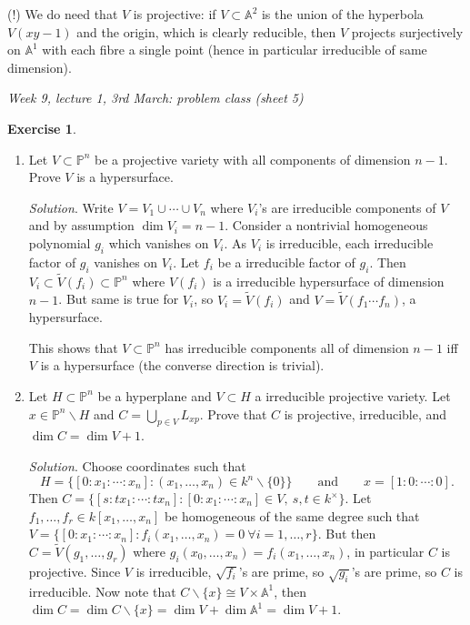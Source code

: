 \documentclass{article}
\newcommand{\A}{\mathbb{A}}
\newcommand{\p}{\mathbb{P}}
\theoremstyle{definition}
\newtheorem{exe}[defn]{Exercise}
\begin{document}
(!) We do need that $V$ is projective: if $V\subset\A^2$ is the union of the hyperbola $V(xy-1)$ and the origin, which is clearly reducible, then $V$ projects surjectively on $\A^1$ with each fibre a single point (hence in particular irreducible of same dimension).

\begin{flushright}
\textit{Week 9, lecture 1, 3rd March: problem class (sheet 5)}
\end{flushright}

\begin{exe}
\begin{enumerate}
\item Let $V\subset\p^n$ be a projective variety with all components of dimension $n-1$. Prove $V$ is a hypersurface.

\textit{Solution}. Write $V=V_1\cup\cdots\cup V_n$ where $V_i$'s are irreducible components of $V$ and by assumption $\dim V_i=n-1$. Consider a nontrivial homogeneous polynomial $g_i$ which vanishes on $V_i$. As $V_i$ is irreducible, each irreducible factor of $g_i$ vanishes on $V_i$. Let $f_i$ be a irreducible factor of $g_i$. Then $V_i\subset\widetilde V(f_i)\subset\p^n$ where $V(f_i)$ is a irreducible hypersurface of dimension $n-1$. But same is true for $V_i$, so $V_i=\widetilde V(f_i)$ and $V=\widetilde V(f_1\cdots f_n)$, a hypersurface.

This shows that $V\subset\p^n$ has irreducible components all of dimension $n-1$ iff $V$ is a hypersurface (the converse direction is trivial).

\item Let $H\subset\p^n$ be a hyperplane and $V\subset H$ a irreducible projective variety. Let $x\in\p^n\backslash H$ and $C=\bigcup_{p\in V}L_{xp}$. Prove that $C$ is projective, irreducible, and $\dim C=\dim V+1$.

\textit{Solution}. Choose coordinates such that
\[
H=\{[0:x_1:\cdots:x_n]:(x_1,\ldots,x_n)\in k^n\backslash\{0\}\}\qquad \text{and} \qquad x=[1:0:\cdots:0].
\]
Then $C=\{[s:tx_1:\cdots:tx_n]:[0:x_1:\cdots:x_n]\in V,\ s,t\in k^\times\}$. Let $f_1,\ldots,f_r\in k[x_1,\ldots,x_n]$ be homogeneous of the same degree such that $V=\{[0:x_1:\cdots:x_n]:f_i(x_1,\ldots,x_n)=0 \ \forall i=1,\ldots,r\}$. But then $C=\widetilde V\left(g_1,\ldots,g_r\right)$ where $g_i(x_0,\ldots,x_n)=f_i(x_1,\ldots,x_n)$, in particular $C$ is projective. Since $V$ is irreducible, $\sqrt{f_i}$'s are prime, so $\sqrt{g_i}$'s are prime, so $C$ is irreducible. Now note that $C\backslash\{x\}\cong V\times\A^1$, then $\dim C=\dim C\backslash\{x\}=\dim V+\dim\A^1=\dim V+1$.


\end{enumerate}
\end{exe}
\end{document}
